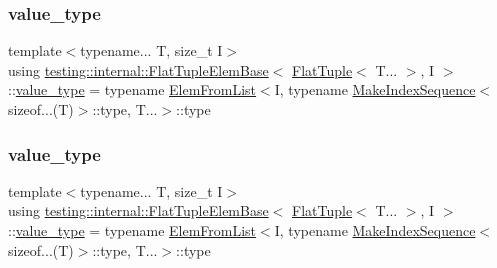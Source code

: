 \subsubsection{\texorpdfstring{value\_type}{value\_type}\hspace{0.1cm}{\footnotesize\ttfamily [1/2]}}
{\footnotesize\ttfamily template$<$typename... T, size\+\_\+t I$>$ \\
using \mbox{\hyperlink{structtesting_1_1internal_1_1_flat_tuple_elem_base}{testing\+::internal\+::\+Flat\+Tuple\+Elem\+Base}}$<$ \mbox{\hyperlink{classtesting_1_1internal_1_1_flat_tuple}{Flat\+Tuple}}$<$ T... $>$, I $>$\+::\mbox{\hyperlink{structtesting_1_1internal_1_1_flat_tuple_elem_base_3_01_flat_tuple_3_01_t_8_8_8_01_4_00_01_i_01_4_a6b87a445f87724f9363b348e6c697766}{value\+\_\+type}} =  typename \mbox{\hyperlink{structtesting_1_1internal_1_1_elem_from_list}{Elem\+From\+List}}$<$I, typename \mbox{\hyperlink{structtesting_1_1internal_1_1_make_index_sequence}{Make\+Index\+Sequence}}$<$sizeof...(T)$>$\+::type, T...$>$\+::type}

\mbox{\label{structtesting_1_1internal_1_1_flat_tuple_elem_base_3_01_flat_tuple_3_01_t_8_8_8_01_4_00_01_i_01_4_a6b87a445f87724f9363b348e6c697766}} 
\subsubsection{\texorpdfstring{value\_type}{value\_type}\hspace{0.1cm}{\footnotesize\ttfamily [2/2]}}
{\footnotesize\ttfamily template$<$typename... T, size\+\_\+t I$>$ \\
using \mbox{\hyperlink{structtesting_1_1internal_1_1_flat_tuple_elem_base}{testing\+::internal\+::\+Flat\+Tuple\+Elem\+Base}}$<$ \mbox{\hyperlink{classtesting_1_1internal_1_1_flat_tuple}{Flat\+Tuple}}$<$ T... $>$, I $>$\+::\mbox{\hyperlink{structtesting_1_1internal_1_1_flat_tuple_elem_base_3_01_flat_tuple_3_01_t_8_8_8_01_4_00_01_i_01_4_a6b87a445f87724f9363b348e6c697766}{value\+\_\+type}} =  typename \mbox{\hyperlink{structtesting_1_1internal_1_1_elem_from_list}{Elem\+From\+List}}$<$I, typename \mbox{\hyperlink{structtesting_1_1internal_1_1_make_index_sequence}{Make\+Index\+Sequence}}$<$sizeof...(T)$>$\+::type, T...$>$\+::type}



